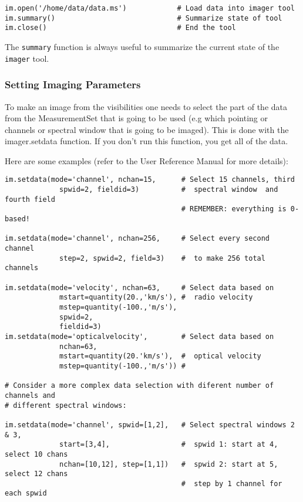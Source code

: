 \small
\begin{verbatim}
im.open('/home/data/data.ms')            # Load data into imager tool
im.summary()                             # Summarize state of tool
im.close()                               # End the tool
\end{verbatim}
\normalsize

The {\tt summary} function is always useful to summarize the current
state of the {\tt imager} tool.

\subsubsection{Setting Imaging Parameters}
\label{subsubsection:synth.im.setdata}

\vspace{3mm}

To make an image from the visibilities one needs to select the part of
the data from the MeasurementSet that is going to be used (e.g which
pointing or channels or spectral window that is going to be imaged).
This is done with the imager.setdata function.  If you don't run this
function, you get all of the data.

Here are some examples (refer to the User Reference Manual for more
details):

\small
\begin{verbatim}
im.setdata(mode='channel', nchan=15,      # Select 15 channels, third
             spwid=2, fieldid=3)          #  spectral window  and fourth field
                                          # REMEMBER: everything is 0-based!

im.setdata(mode='channel', nchan=256,     # Select every second channel
             step=2, spwid=2, field=3)    #  to make 256 total channels

im.setdata(mode='velocity', nchan=63,     # Select data based on
             mstart=quantity(20.,'km/s'), #  radio velocity
             mstep=quantity(-100.,'m/s'),
             spwid=2,
             fieldid=3)
im.setdata(mode='opticalvelocity',        # Select data based on
             nchan=63,
             mstart=quantity(20.'km/s'),  #  optical velocity
             mstep=quantity(-100.,'m/s')) #

# Consider a more complex data selection with diferent number of channels and
# different spectral windows:

im.setdata(mode='channel', spwid=[1,2],   # Select spectral windows 2 & 3,
             start=[3,4],                 #  spwid 1: start at 4, select 10 chans
             nchan=[10,12], step=[1,1])   #  spwid 2: start at 5, select 12 chans
                                          #  step by 1 channel for each spwid
\end{verbatim}
\normalsize

